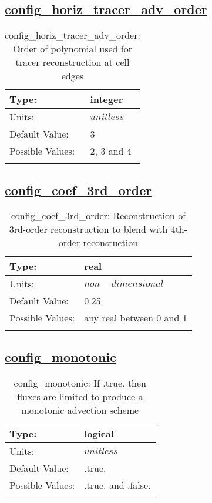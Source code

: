 \subsection[config\_horiz\_tracer\_adv\_order]{\hyperref[sec:nm_tab_advection]{config\_horiz\_tracer\_adv\_order}}
\label{subsec:nm_sec_config_horiz_tracer_adv_order}
\begin{center}
\begin{longtable}{| p{2.0in} | p{4.0in} |}
    \hline
    Type: & integer \\
    \hline
    Units: & $unitless$ \\
    \hline
    Default Value: & 3 \\
    \hline
    Possible Values: & 2, 3 and 4 \\
    \hline
    \caption{config\_horiz\_tracer\_adv\_order: Order of polynomial used for tracer reconstruction at cell edges}
\end{longtable}
\end{center}
\subsection[config\_coef\_3rd\_order]{\hyperref[sec:nm_tab_advection]{config\_coef\_3rd\_order}}
\label{subsec:nm_sec_config_coef_3rd_order}
\begin{center}
\begin{longtable}{| p{2.0in} | p{4.0in} |}
    \hline
    Type: & real \\
    \hline
    Units: & $non-dimensional$ \\
    \hline
    Default Value: & 0.25 \\
    \hline
    Possible Values: & any real between 0 and 1 \\
    \hline
    \caption{config\_coef\_3rd\_order: Reconstruction of 3rd-order reconstruction to blend with 4th-order reconstuction}
\end{longtable}
\end{center}
\subsection[config\_monotonic]{\hyperref[sec:nm_tab_advection]{config\_monotonic}}
\label{subsec:nm_sec_config_monotonic}
\begin{center}
\begin{longtable}{| p{2.0in} | p{4.0in} |}
    \hline
    Type: & logical \\
    \hline
    Units: & $unitless$ \\
    \hline
    Default Value: & .true. \\
    \hline
    Possible Values: & .true. and .false. \\
    \hline
    \caption{config\_monotonic: If .true. then fluxes are limited to produce a monotonic advection scheme}
\end{longtable}
\end{center}
